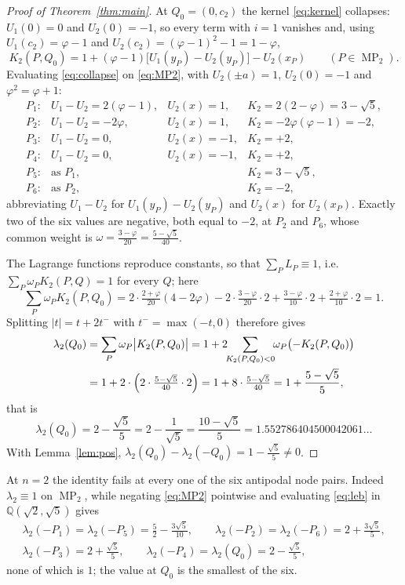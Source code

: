 \documentclass[11pt]{amsart}
\DeclareMathOperator{\MP}{MP}
\newcommand{\ph}{\varphi}
\begin{document}
\begin{proof}[Proof of Theorem~\ref{thm:main}]
At $Q_0=(0,c_2)$ the kernel \eqref{eq:kernel} collapses: $U_1(0)=0$ and
$U_2(0)=-1$, so every term with $i=1$ vanishes and, using
$U_1(c_2)=\ph-1$ and $U_2(c_2)=(\ph-1)^2-1=1-\ph$,
\begin{equation}\label{eq:collapse}
  K_2(P,Q_0)=1+(\ph-1)\bigl[U_1(y_P)-U_2(y_P)\bigr]-U_2(x_P)
  \qquad (P\in\MP_2).
\end{equation}
Evaluating \eqref{eq:collapse} on \eqref{eq:MP2}, with $U_2(\pm a)=1$,
$U_2(0)=-1$ and $\ph^2=\ph+1$:
\[
\begin{array}{llll}
 P_1: & U_1-U_2=2(\ph-1), & U_2(x)=1,  & K_2=2(2-\ph)=3-\sqrt5,\\[2pt]
 P_2: & U_1-U_2=-2\ph,    & U_2(x)=1,  & K_2=-2\ph(\ph-1)=-2,\\[2pt]
 P_3: & U_1-U_2=0,        & U_2(x)=-1, & K_2=+2,\\[2pt]
 P_4: & U_1-U_2=0,        & U_2(x)=-1, & K_2=+2,\\[2pt]
 P_5: & \text{as }P_1,    &            & K_2=3-\sqrt5,\\[2pt]
 P_6: & \text{as }P_2,    &            & K_2=-2 ,
\end{array}
\]
abbreviating $U_1-U_2$ for $U_1(y_P)-U_2(y_P)$ and $U_2(x)$ for $U_2(x_P)$.
Exactly two of the six values are negative, both equal to $-2$, at
$P_2$ and $P_6$, whose common weight is $\omega=\frac{3-\ph}{20}
=\frac{5-\sqrt5}{40}$.

The Lagrange functions reproduce constants, so that $\sum_PL_P\equiv1$,
i.e.\ $\sum_P\omega_PK_2(P,Q)=1$ for every $Q$; here
\[
  \sum_P\omega_PK_2(P,Q_0)
  =2\cdot\tfrac{2+\ph}{20}(4-2\ph)-2\cdot\tfrac{3-\ph}{20}\cdot2
   +\tfrac{3-\ph}{10}\cdot2+\tfrac{2+\ph}{10}\cdot2=1 .
\]
Splitting $|t|=t+2t^-$ with $t^-=\max(-t,0)$ therefore gives
\begin{align*}
  \lambda_2(Q_0)&=\sum_P\omega_P\bigl|K_2(P,Q_0)\bigr|
   =1+2\!\!\sum_{K_2(P,Q_0)<0}\!\!\omega_P\bigl(-K_2(P,Q_0)\bigr)\\
  &=1+2\cdot\Bigl(2\cdot\tfrac{5-\sqrt5}{40}\cdot2\Bigr)
   =1+8\cdot\tfrac{5-\sqrt5}{40}
   =1+\frac{5-\sqrt5}5,
\end{align*}
that is
\[
  \lambda_2(Q_0)=2-\frac{\sqrt5}5=2-\frac1{\sqrt5}=\frac{10-\sqrt5}5
  =1.552786404500042061\ldots
\]
With Lemma~\ref{lem:pos}, $\lambda_2(Q_0)-\lambda_2(-Q_0)=1-\frac{\sqrt5}5\ne0$.
\end{proof}

At $n=2$ the identity fails at every one of the six antipodal node pairs.
Indeed $\lambda_2\equiv1$ on $\MP_2$, while negating \eqref{eq:MP2} pointwise
and evaluating \eqref{eq:leb} in $\mathbb Q(\sqrt2,\sqrt5)$ gives
\begin{equation}\label{eq:table2}
\begin{gathered}
  \lambda_2(-P_1)=\lambda_2(-P_5)=\tfrac52-\tfrac{3\sqrt5}{10},\qquad
  \lambda_2(-P_2)=\lambda_2(-P_6)=2+\tfrac{3\sqrt5}5,\\
  \lambda_2(-P_3)=2+\tfrac{\sqrt5}5,\qquad
  \lambda_2(-P_4)=\lambda_2(Q_0)=2-\tfrac{\sqrt5}5 ,
\end{gathered}
\end{equation}
none of which is $1$; the value at $Q_0$ is the smallest of the six.
\end{document}
